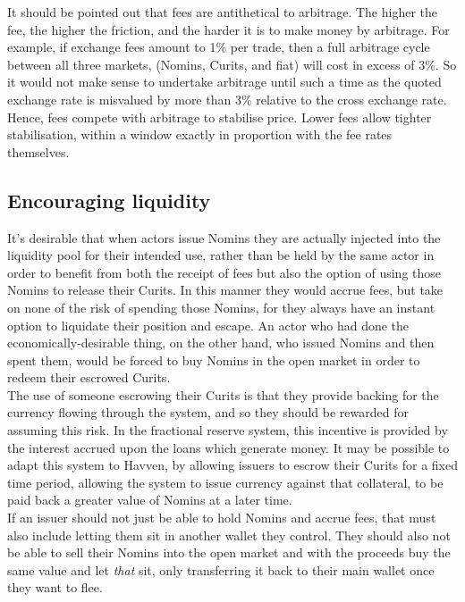 It should be pointed out that fees are antithetical to arbitrage. The higher the fee, the higher the friction, and the harder it is to make money by arbitrage. For example, if exchange fees amount to 1\% per trade, then a full arbitrage cycle between all three markets, (Nomins, Curits, and fiat) will cost in excess of 3\%. So it would not make sense to undertake arbitrage until such a time as the quoted exchange rate is misvalued by more than 3\% relative to the cross exchange rate. Hence, fees compete with arbitrage to stabilise price. Lower fees allow tighter stabilisation, within a window exactly in proportion with the fee rates themselves.


\pagebreak
\subsection{Encouraging liquidity}

\noindent It's desirable that when actors issue Nomins they are actually injected into the liquidity pool for their intended use, rather than be held by the same actor in order to benefit from both the receipt of fees but also the option of using those Nomins to release their Curits. In this manner they would accrue fees, but take on none of the risk of spending those Nomins, for they always have an instant option to liquidate their position and escape. An actor who had done the economically-desirable thing, on the other hand, who issued Nomins and then spent them, would be forced to buy Nomins in the open market in order to redeem their escrowed Curits. \\

\noindnet The use of someone escrowing their Curits is that they provide backing for the currency flowing through the system, and so they should be rewarded for assuming this risk. In the fractional reserve system, this incentive is provided by the interest accrued upon the loans which generate money. It may be possible to adapt this system to Havven, by allowing issuers to escrow their Curits for a fixed time period, allowing the system to issue currency against that collateral, to be paid back a greater value of Nomins at a later time. \\

\noindent If an issuer should not just be able to hold Nomins and accrue fees, that must also include letting them sit in another wallet they control. They should also not be able to sell their Nomins into the open market and with the proceeds buy the same value and let \textit{that} sit, only transferring it back to their main wallet once they want to flee.

